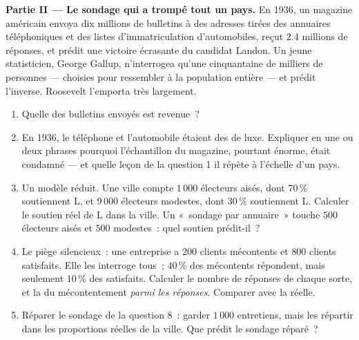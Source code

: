 \begin{problem}
\medskip
\noindent\textbf{Partie II --- Le sondage qui a trompé tout un pays.}
En 1936, un magazine américain envoya dix millions de bulletins à des
adresses tirées des annuaires téléphoniques et des listes
d'immatriculation d'automobiles, reçut $2.4$ millions de réponses, et
prédit une victoire écrasante du candidat Landon. Un jeune
statisticien, George Gallup, n'interrogea qu'une cinquantaine de
milliers de personnes --- choisies pour ressembler à la population
entière --- et prédit l'inverse. Roosevelt l'emporta très largement.
\begin{enumerate}[resume]
  \item Quelle  des bulletins envoyés est revenue~?
  \item En 1936, le téléphone et l'automobile étaient des  de
        luxe. Expliquer en une ou deux phrases pourquoi
        l'échantillon du magazine, pourtant énorme, était condamné
        --- et quelle leçon de la question 1 il répète à l'échelle
        d'un pays.
  \item Un modèle réduit. Une ville compte $1\,000$ électeurs aisés,
        dont $70\,\%$ soutiennent L, et $9\,000$ électeurs modestes,
        dont $30\,\%$ soutiennent L. Calculer le soutien réel de L
        dans la ville. Un «~sondage par annuaire~» touche $500$
        électeurs aisés et $500$ modestes~: quel soutien
        prédit-il~?
  \item Le piège silencieux~: une entreprise a $200$ clients
        mécontents et $800$ clients satisfaits. Elle les interroge
        tous~; $40\,\%$ des mécontents répondent, mais seulement
        $10\,\%$ des satisfaits. Calculer le nombre de réponses de
        chaque sorte, et la  du mécontentement \emph{parmi
        les réponses}. Comparer avec la  réelle.
  \item Réparer le sondage de la question 8~: garder $1\,000$
        entretiens, mais les répartir dans les proportions réelles
        de la ville. Que prédit le sondage réparé~?
\end{enumerate}


\end{problem}
